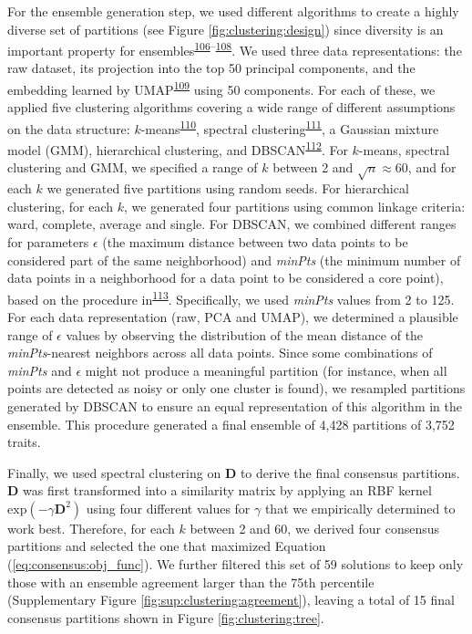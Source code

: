 \documentclass[
  a4paper,
]{article}
\begin{document}
For the ensemble generation step, we used different algorithms to create a highly diverse set of partitions (see Figure \ref{fig:clustering:design}) since diversity is an important property for ensembles\textsuperscript{\protect\hyperlink{ref-8js8Q3pF}{106}--\protect\hyperlink{ref-t5p3UpxZ}{108}}.
We used three data representations: the raw dataset, its projection into the top 50 principal components, and the embedding learned by UMAP\textsuperscript{\protect\hyperlink{ref-157h5hA34}{109}} using 50 components.
For each of these, we applied five clustering algorithms covering a wide range of different assumptions on the data structure: \(k\)-means\textsuperscript{\protect\hyperlink{ref-MxGpAiPu}{110}}, spectral clustering\textsuperscript{\protect\hyperlink{ref-x3CT24TB}{111}}, a Gaussian mixture model (GMM), hierarchical clustering, and DBSCAN\textsuperscript{\protect\hyperlink{ref-JrL3iQea}{112}}.
For \(k\)-means, spectral clustering and GMM, we specified a range of \(k\) between 2 and \(\sqrt{n} \approx 60\), and for each \(k\) we generated five partitions using random seeds.
For hierarchical clustering, for each \(k\), we generated four partitions using common linkage criteria: ward, complete, average and single.
For DBSCAN, we combined different ranges for parameters \(\epsilon\) (the maximum distance between two data points to be considered part of the same neighborhood) and \emph{minPts} (the minimum number of data points in a neighborhood for a data point to be considered a core point), based on the procedure in\textsuperscript{\protect\hyperlink{ref-FB7XPWl6}{113}}.
Specifically, we used \emph{minPts} values from 2 to 125.
For each data representation (raw, PCA and UMAP), we determined a plausible range of \(\epsilon\) values by observing the distribution of the mean distance of the \emph{minPts}-nearest neighbors across all data points.
Since some combinations of \emph{minPts} and \(\epsilon\) might not produce a meaningful partition (for instance, when all points are detected as noisy or only one cluster is found), we resampled partitions generated by DBSCAN to ensure an equal representation of this algorithm in the ensemble.
This procedure generated a final ensemble of 4,428 partitions of 3,752 traits.

Finally, we used spectral clustering on \(\mathbf{D}\) to derive the final consensus partitions.
\(\mathbf{D}\) was first transformed into a similarity matrix by applying an RBF kernel \(\mathrm{exp}(-\gamma \mathbf{D}^2)\) using four different values for \(\gamma\) that we empirically determined to work best.
Therefore, for each \(k\) between 2 and 60, we derived four consensus partitions and selected the one that maximized Equation (\ref{eq:consensus:obj_func}).
We further filtered this set of 59 solutions to keep only those with an ensemble agreement larger than the 75th percentile (Supplementary Figure \ref{fig:sup:clustering:agreement}), leaving a total of 15 final consensus partitions shown in Figure \ref{fig:clustering:tree}.
\end{document}
